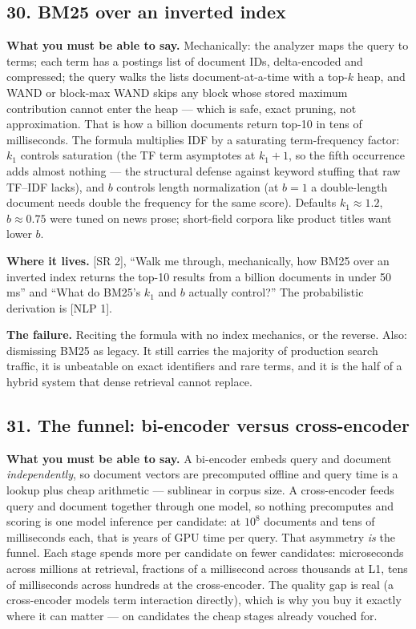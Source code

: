\subsection*{30. BM25 over an inverted index}

\textbf{What you must be able to say.} Mechanically: the analyzer maps the query to terms; each term has a postings list of document IDs, delta-encoded and compressed; the query walks the lists document-at-a-time with a top-$k$ heap, and WAND or block-max WAND skips any block whose stored maximum contribution cannot enter the heap --- which is safe, exact pruning, not approximation. That is how a billion documents return top-10 in tens of milliseconds. The formula multiplies IDF by a saturating term-frequency factor: $k_1$ controls saturation (the TF term asymptotes at $k_1 + 1$, so the fifth occurrence adds almost nothing --- the structural defense against keyword stuffing that raw TF--IDF lacks), and $b$ controls length normalization (at $b = 1$ a double-length document needs double the frequency for the same score). Defaults $k_1 \approx 1.2$, $b \approx 0.75$ were tuned on news prose; short-field corpora like product titles want lower $b$.

\textbf{Where it lives.} [SR 2], ``Walk me through, mechanically, how BM25 over an inverted index returns the top-10 results from a billion documents in under 50\,ms'' and ``What do BM25's $k_1$ and $b$ actually control?'' The probabilistic derivation is [NLP 1].

\textbf{The failure.} Reciting the formula with no index mechanics, or the reverse. Also: dismissing BM25 as legacy. It still carries the majority of production search traffic, it is unbeatable on exact identifiers and rare terms, and it is the half of a hybrid system that dense retrieval cannot replace.

\subsection*{31. The funnel: bi-encoder versus cross-encoder}

\textbf{What you must be able to say.} A bi-encoder embeds query and document \emph{independently}, so document vectors are precomputed offline and query time is a lookup plus cheap arithmetic --- sublinear in corpus size. A cross-encoder feeds query and document together through one model, so nothing precomputes and scoring is one model inference per candidate: at $10^8$ documents and tens of milliseconds each, that is years of GPU time per query. That asymmetry \emph{is} the funnel. Each stage spends more per candidate on fewer candidates: microseconds across millions at retrieval, fractions of a millisecond across thousands at L1, tens of milliseconds across hundreds at the cross-encoder. The quality gap is real (a cross-encoder models term interaction directly), which is why you buy it exactly where it can matter --- on candidates the cheap stages already vouched for.

